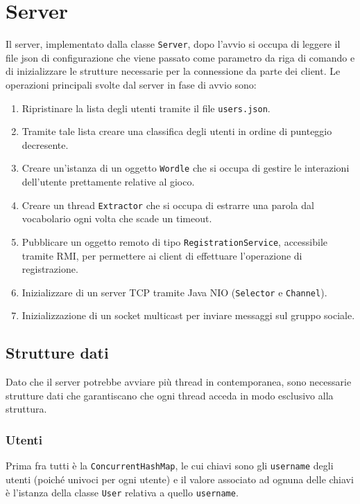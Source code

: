 \section{Server}
Il server, implementato dalla classe \verb|Server|, dopo l'avvio si occupa di leggere il file json
di configurazione che viene passato come parametro da riga di comando e di inizializzare le
strutture necessarie per la connessione da parte dei client. Le operazioni principali svolte dal
server in fase di avvio sono:
\begin{enumerate}
	\item Ripristinare la lista degli utenti tramite il file \verb|users.json|.
	\item Tramite tale lista creare una classifica degli utenti in ordine di punteggio decresente.
	\item Creare un'istanza di un oggetto \verb|Wordle| che si occupa di gestire le interazioni
	      dell'utente prettamente relative al gioco.
	\item Creare un thread \verb|Extractor| che si occupa di estrarre una parola dal vocabolario
	      ogni volta che scade un timeout.
	\item Pubblicare un oggetto remoto di tipo \verb|RegistrationService|, accessibile tramite RMI,
	      per permettere ai client di effettuare l'operazione di registrazione.
	\item Inizializzare di un server TCP tramite Java NIO (\verb|Selector| e \verb|Channel|).
	\item Inizializzazione di un socket multicast per inviare messaggi sul gruppo sociale.
\end{enumerate}

\subsection{Strutture dati}
Dato che il server potrebbe avviare più thread in contemporanea, sono necessarie strutture dati che
garantiscano che ogni thread acceda in modo esclusivo alla struttura.

\subsubsection{Utenti}
Prima fra tutti è la \verb|ConcurrentHashMap|, le cui chiavi sono gli \verb|username| degli utenti
(poiché univoci per ogni utente) e il valore associato ad ognuna delle chiavi è l'istanza della
classe \verb|User| relativa a quello \verb|username|.

